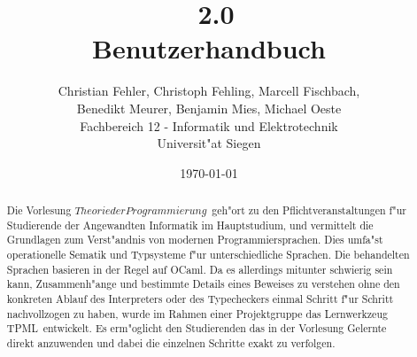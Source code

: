 \documentclass[a4paper,fleqn,latin1,twoside,12pt]{report}
\title{{\Huge \TPML\ 2.0}\\Benutzerhandbuch}
\author{{\Large Christian Fehler, Christoph Fehling, Marcell Fischbach,}\\{\Large Benedikt Meurer, Benjamin Mies, Michael Oeste}\\Fachbereich 12 - Informatik und Elektrotechnik\\Universit"at Siegen}
\date{\small\today}
\newcommand{\TPML}{\textsf{\textmd{TPML}}}
\begin{document}
\maketitle

\begin{abstract}
Die Vorlesung \glqq$Theorie der Programmierung$\grqq\ geh"ort zu den Pflichtveranstaltungen
f"ur Studierende der Angewandten Informatik im Hauptstudium, und vermittelt die Grundlagen
zum Verst"andnis von modernen Programmiersprachen. Dies umfa"st operationelle Sematik und
Typsysteme f"ur unterschiedliche Sprachen. Die behandelten Sprachen basieren in der Regel
auf OCaml. Da es allerdings mitunter schwierig sein kann, Zusammenh"ange und bestimmte Details
eines Beweises zu verstehen ohne den konkreten Ablauf des Interpreters oder des Typecheckers
einmal Schritt f"ur Schritt nachvollzogen zu haben, wurde im Rahmen einer Projektgruppe das
Lernwerkzeug \TPML\ entwickelt. Es erm"oglicht den Studierenden das in der Vorlesung Gelernte
direkt anzuwenden und dabei die einzelnen Schritte exakt zu verfolgen.
\end{abstract}

\tableofcontents
\newpage









\begin{appendix}

\end{appendix}

\printindex
\end{document}
